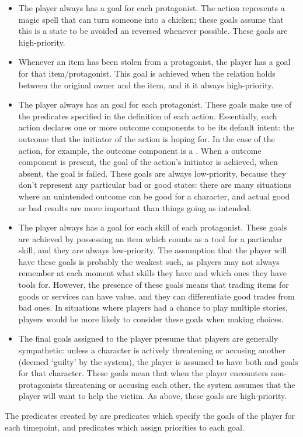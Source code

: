 \begin{enumerate}
\begin{itemize}
      \item The player always has a  goal for each protagonist. The  action represents a magic spell that can turn someone into a chicken; these goals assume that this is a state to be avoided an reversed whenever possible. These goals are high-priority.
      \item Whenever an item has been stolen from a protagonist, the player has a  goal for that item/protagonist. This goal is achieved when the  relation holds between the original owner and the item, and it it always high-priority.
      \item The player always has an  goal for each protagonist. These goals make use of the  predicates specified in the definition of each action. Essentially, each action declares one or more outcome components to be its default intent: the outcome that the initiator of the action is hoping for. In the case of the  action, for example, the outcome component  is a . When a  outcome component is present, the  goal of the action's initiator is achieved, when absent, the goal is failed. These goals are always low-priority, because they don't represent any particular bad or good states: there are many situations where an unintended outcome can be good for a character, and actual good or bad results are more important than things going as intended.
      \item The player always has a  goal for each skill of each protagonist. These goals are achieved by possessing an item which counts as a tool for a particular skill, and they are always low-priority. The assumption that the player will have these goals is probably the weakest such, as players may not always remember at each moment what skills they have and which ones they have tools for. However, the presence of these goals means that trading items for goods or services can have value, and they can differentiate good trades from bad ones. In situations where players had a chance to play multiple stories, players would be more likely to consider these goals when making choices.
      \item The final goals assigned to the player presume that players are generally sympathetic: unless a character is actively threatening or accusing another (deemed `guilty' by the system), the player is assumed to have both  and  goals for that character. These goals mean that when the player encounters non-protagonists threatening or accusing each other, the system assumes that the player will want to help the victim. As above, these goals are high-priority.
    \end{itemize}
    The predicates created by  are  predicates which specify the goals of the player for each timepoint, and  predicates which assign priorities to each goal.



\end{enumerate}
